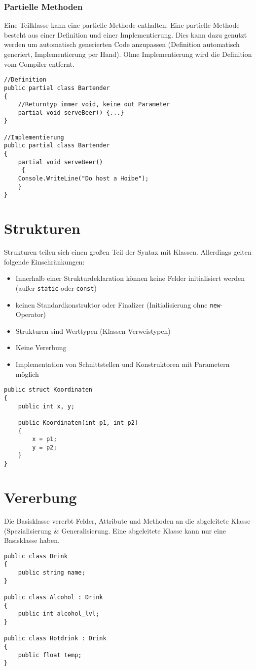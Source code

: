 \subsubsection{Partielle Methoden}
Eine Teilklasse kann eine partielle Methode enthalten. Eine partielle Methode besteht aus einer Definition und einer Implementierung. Dies kann dazu genutzt werden um automatisch generierten Code anzupassen (Definition automatisch generiert, Implementierung per Hand). Ohne Implementierung wird die Definition vom Compiler entfernt.
\begin{lstlisting}
//Definition
public partial class Bartender
{
	//Returntyp immer void, keine out Parameter
	partial void serveBeer() {...}
}

//Implementierung
public partial class Bartender
{
	partial void serveBeer()
	 {
	Console.WriteLine("Do host a Hoibe");
	}
}
\end{lstlisting}
\section{Strukturen}
Strukturen teilen sich einen großen Teil der Syntax mit Klassen. Allerdings gelten folgende Einschränkungen:
\begin{itemize}
\item Innerhalb einer Strukturdeklaration können keine Felder initialisiert werden (außer \texttt{static} oder \texttt{const})
\item keinen Standardkonstruktor oder Finalizer (Initialisierung ohne \texttt{new}-Operator)
\item Strukturen sind Werttypen (Klassen Verweistypen)
\item Keine Vererbung
\item Implementation von Schnittstellen und Konstruktoren mit Parametern möglich
\end{itemize}
\begin{lstlisting}
public struct Koordinaten
{
    public int x, y;

    public Koordinaten(int p1, int p2)
    {
        x = p1;
        y = p2;
    }
}
\end{lstlisting}
\section{Vererbung}
Die Basisklasse vererbt Felder, Attribute und Methoden an die abgeleitete Klasse (Spezialisierung \& Generalisierung. Eine abgeleitete Klasse kann nur eine Basisklasse haben.
\begin{lstlisting}
public class Drink
{
	public string name;
}

public class Alcohol : Drink
{
	public int alcohol_lvl;
}

public class Hotdrink : Drink
{
	public float temp;
}
\end{lstlisting}
